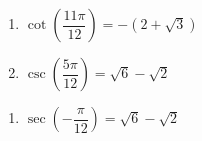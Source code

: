 \begin{multicols}{2}

\begin{enumerate}

\setcounter{enumi}{\value{HW}}

\item $\cot \left( \dfrac{11\pi}{12} \right) = -(2 + \sqrt{3})$
\item $\csc \left( \dfrac{5\pi}{12} \right) = \sqrt{6} - \sqrt{2}$

\setcounter{HW}{\value{enumi}}

\end{enumerate}

\end{multicols}

\begin{multicols}{2}

\begin{enumerate}

\setcounter{enumi}{\value{HW}}

\item $\sec \left( -\dfrac{\pi}{12} \right) = \sqrt{6} - \sqrt{2}$

\setcounter{HW}{\value{enumi}}

\end{enumerate}

\end{multicols}

